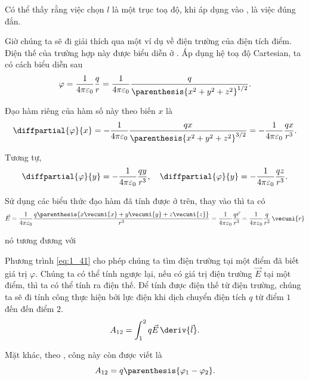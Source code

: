 \noindent
Có thể thấy rằng việc chọn $l$ là một trục toạ độ, khi áp dụng  vào , là việc đúng đắn.

Giờ chúng ta sẽ đi giải thích  qua một ví dụ về điện trường của điện tích điểm. Điện thế của trường hợp này được biểu diễn ở . Áp dụng hệ toạ độ Cartesian, ta có cách biểu diễn sau
\begin{equation*}
	\varphi = \frac{1}{4\pi\varepsilon_0} \frac{q}{r} = \frac{1}{4\pi\varepsilon_0} \frac{q}{\parenthesis{x^2 + y^2 + z^2}^{1/2}}.
\end{equation*}

\noindent
Đạo hàm riêng của hàm số này theo biến $x$ là
\begin{equation*}
	\diffpartial{\varphi}{x} = -\frac{1}{4\pi\varepsilon_0} \frac{qx}{\parenthesis{x^2 + y^2 + z^2}^{3/2}} = -\frac{1}{4\pi\varepsilon_0} \frac{qx}{r^3}.
\end{equation*}

\noindent
Tương tự,
\begin{equation*}
	\diffpartial{\varphi}{y} = -\frac{1}{4\pi\varepsilon_0} \frac{qy}{r^3},\quad \diffpartial{\varphi}{y} = -\frac{1}{4\pi\varepsilon_0} \frac{qz}{r^3}.
\end{equation*}

\noindent
Sử dụng các biểu thức đạo hàm đã tính được ở trên, thay vào thì ta có
\begin{equation*}
	\vec{E} = \frac{1}{4\pi\varepsilon_0} \frac{q \parenthesis{x\vecuni{x}+y\vecuni{y}+z\vecuni{z}}}{r^3} = \frac{1}{4\pi\varepsilon_0} \frac{q\vec{r}}{r^3} = \frac{1}{4\pi\varepsilon_0} \frac{q}{r^2}\,\vecuni{r}
\end{equation*}

\noindent
nó tương đương với 

Phương trình \eqref{eq:1_41} cho phép chúng ta tìm điện trường tại một điểm đã biết giá trị $\varphi$. Chúng ta có thể tính ngược lại, nếu có giá trị điện trường $\vec{E}$ tại một điểm, thì ta có thể tính ra điện thế. Để tính được điện thế từ điện trường, chúng ta sẽ đi tính công thực hiện bởi lực điện khi dịch chuyển điện tích $q$ từ điểm $1$ đến đến điểm $2$.
\begin{equation*}
	A_{12} = \int_1^2 q \vec{E}\, \deriv{\vec{l}}.
\end{equation*}

\noindent
Mặt khác, theo , công này còn được viết là
\begin{equation*}
	A_{12} = q \parenthesis{\varphi_1 - \varphi_2}.
\end{equation*}

